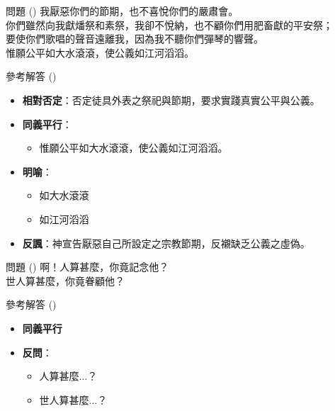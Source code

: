 \documentclass{beamer}
\begin{document}
\begin{frame}{問題 ()}
  我厭惡你們的節期，也不喜悅你們的嚴肅會。\\
  你們雖然向我獻燔祭和素祭，我卻不悅納，也不顧你們用肥畜獻的平安祭；\\
  要使你們歌唱的聲音遠離我，因為我不聽你們彈琴的響聲。\\
  惟願公平如大水滾滾，使公義如江河滔滔。
\end{frame}

\begin{frame}{參考解答 ()}
  \begin{itemize}
    \item\textbf{相對否定}：否定徒具外表之祭祀與節期，要求實踐真實公平與公義。
    \item\textbf{同義平行}：
      \begin{itemize}
        \item 惟願公平如大水滾滾，使公義如江河滔滔。
      \end{itemize}
    \item\textbf{明喻}：
      \begin{itemize}
        \item 如大水滾滾
        \item 如江河滔滔
      \end{itemize}
    \item\textbf{反諷}：神宣告厭惡自己所設定之宗教節期，反襯缺乏公義之虛偽。
  \end{itemize}
\end{frame}

\begin{frame}{問題 ()}
  啊！人算甚麼，你竟記念他？\\
  世人算甚麼，你竟眷顧他？\\
\end{frame}

\begin{frame}{參考解答 ()}
  \begin{itemize}
    \item\textbf{同義平行}
    \item\textbf{反問}：
      \begin{itemize}
        \item 人算甚麼$\dots$？
        \item 世人算甚麼$\dots$？
      \end{itemize}
  \end{itemize}
\end{frame}
\end{document}
